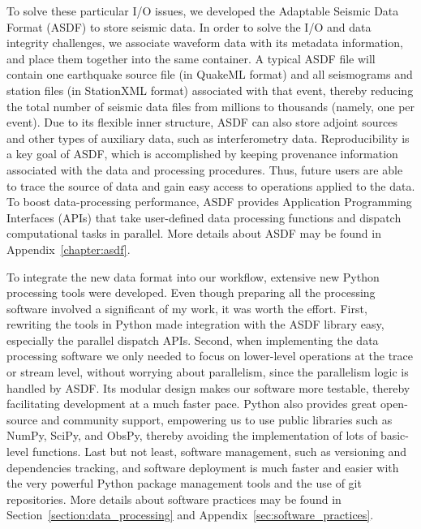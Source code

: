 To solve these particular I/O issues, we developed the Adaptable
Seismic Data Format (ASDF) to store seismic data. 
In order to solve the I/O and data integrity challenges, we associate
waveform data with its metadata information, and place them together into the same container.
A typical ASDF file will contain one
earthquake source file (in QuakeML format) and all seismograms and station files (in StationXML format) associated with that event,
thereby reducing the total number of seismic data files from millions to thousands (namely, one per event).
Due to its flexible inner structure,
ASDF can also store adjoint sources and other types of auxiliary data,
such as interferometry data.
Reproducibility is a key goal of ASDF,
which is accomplished by keeping provenance information
associated with the data and processing procedures.
Thus, future users are able to trace the source of data and gain easy access
to operations applied to the data.
To boost data-processing performance, ASDF provides Application Programming Interfaces (APIs) that take
user-defined data processing functions and dispatch computational tasks in parallel.
More details about ASDF may be found in Appendix~\ref{chapter:asdf}.

To integrate the new data format into our workflow,
extensive new Python processing tools were developed.
Even though preparing all the processing software involved a significant of my work,
it was  worth the effort.
First, rewriting the tools in Python made integration with the ASDF library easy,
especially the parallel dispatch APIs.
Second,
when implementing the data processing software we only needed to focus on lower-level
operations at the trace or stream level, without worrying about parallelism,
since the parallelism logic is handled by ASDF.
Its modular design makes our software more testable, thereby facilitating development at a much faster pace.
Python also provides great open-source and community support,
empowering us to use public libraries such as NumPy, SciPy, and ObsPy,
thereby avoiding the implementation of lots of basic-level functions.
Last but not least, software management, such as versioning and dependencies tracking,
and software deployment is much faster and easier with the very powerful Python package management tools and
the use of git repositories.
More details about software practices may be found in 
Section~\ref{section:data_processing} and Appendix~\ref{sec:software_practices}.

